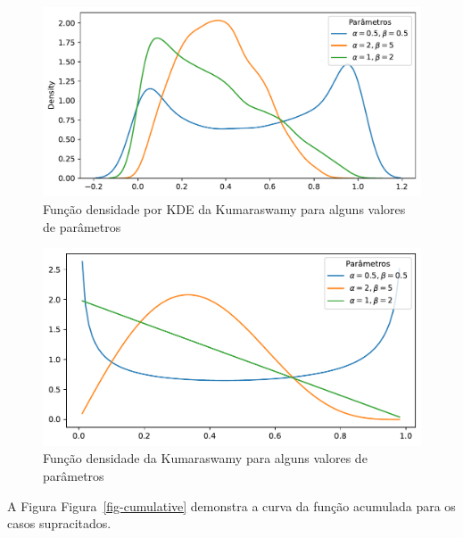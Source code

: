\documentclass[
]{article}
\begin{document}
\begin{figure}[H]

{\centering \includegraphics{report_files/figure-pdf/fig-density1-output-1.pdf}

}

\caption{\label{fig-density1}Função densidade por KDE da Kumaraswamy
para alguns valores de parâmetros}

\end{figure}

\begin{figure}[H]

{\centering \includegraphics{report_files/figure-pdf/fig-density2-output-1.pdf}

}

\caption{\label{fig-density2}Função densidade da Kumaraswamy para alguns
valores de parâmetros}

\end{figure}

A Figura Figura~\ref{fig-cumulative} demonstra a curva da função
acumulada para os casos supracitados.
\end{document}
